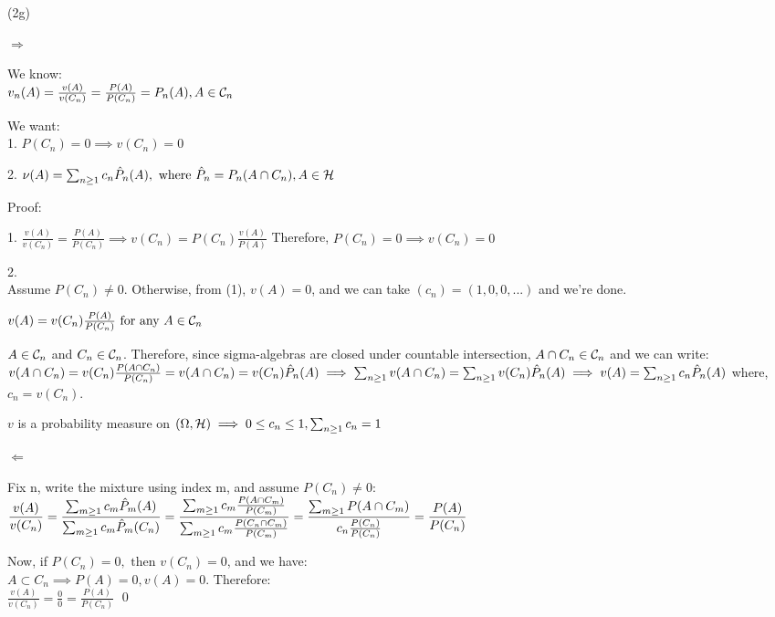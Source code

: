 (2g)

$\Rightarrow$


We know: \\
$ 
v_n(A) = 
\frac{v(A)}{v(C_n)} =
\frac{P(A)}{P(C_n)} =
P_n(A),
A \in \calC_n
$

We want: \\
1.
$
P(C_n) = 0 \implies v(C_n) = 0
$

2.
$
\nu(A) = \csum c_n \hat{P}_n(A), \text{ where } 
\hat{P}_n = P_n(A \cap C_n), A \in \sigAlg
$

Proof:

1.
$
\frac{v(A)}{v(C_n)} =
\frac{P(A)}{P(C_n)} 
\implies
v(C_n) = P(C_n)\frac{v(A)}{P(A)}
$
Therefore, $
P(C_n) = 0 \implies v(C_n) = 0
$

2.\\
Assume $P(C_n) \neq 0$. Otherwise, from (1), $v(A) = 0$, and we can take $(c_n) = (1, 0, 0, ...)$ and we're done.

$
v(A) = v(C_n)\frac{P(A)}{P(C_n)} \text{ for any } A \in \calC_n
$

$ A \in \calC_n $ and $ C_n \in \calC_n $. Therefore, since sigma-algebras are closed under countable intersection, $ A \cap C_n \in \calC_n $ and we can write:
$
v(A \cap C_n) = 
v(C_n)\frac{P(A \cap C_n)}{P(C_n)} =
v(A \cap C_n) = v(C_n) \hat{P}_n(A) \\ 
\implies \csum v(A \cap C_n) = \csum v(C_n)\hat{P}_n(A) \\ 
\implies v(A) = \csum c_n\hat{P}_n(A)
$
where, $c_n = v(C_n)$.

$v$ is a probability measure on $(\Omega, \sigAlg) \implies 0 \leq c_n \leq 1, \csum c_n = 1 $ 


$\Leftarrow$

Fix n, write the mixture using index m, and assume $P(C_n) \neq 0$:\\
$
\dfrac{v(A)}{v(C_n)} = 
\dfrac {\csum[m] c_m\hat{P}_m(A)} {\csum[m] c_m\hat{P}_m(C_n)} = 
\dfrac {\csum[m] c_m \frac{P(A \cap C_m)}{P(C_m)}} {\csum[m] c_m \frac{P(C_n \cap C_m)}{P(C_m)}} = 
\dfrac {\csum[m]P(A \cap C_m)} {c_n \frac{P(C_n)}{P(C_n)}} = \dfrac{P(A)}{P(C_n)}
$

Now, if $ P(C_n) = 0, \text{ then } v(C_n) = 0$, and we have:\\
$ A \subset C_n \implies P(A) = 0, v(A) = 0 $. Therefore:\\
$\frac{v(A)}{v(C_n)} = \frac{0}{0} = \frac{P(A)}{P(C_n)} $
\qed


